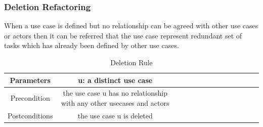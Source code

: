 \subsubsection{Deletion Refactoring}\label{section:selection_by_use_case/guidelines_for_use_case_refactoring/deletion_refactoring}
When a use case is defined but no relationship can be agreed with other use cases or actors then it can be referred that the use case represent redundant set of tasks which has already been defined by other use cases.
\begin{table}[H]
  \centering
  \begin{adjustbox}{max width=\textwidth}
  \begin{tabular}{*{14}{|c}|}%
  \hline
  Parameters      & u: a distinct use case\\
                    \hline
   Precondition     & the use case u has no relationship with any other usecases and actors\\
                    \hline
   Postconditions   & the use case u is deleted\\
                    \hline
\end{tabular}
\end{adjustbox}
  \caption{Deletion Rule}
  \label{tab:selection_by_use_case/guidelines_for_use_case_refactoring/deletion_rule}
\end{table}
\\

